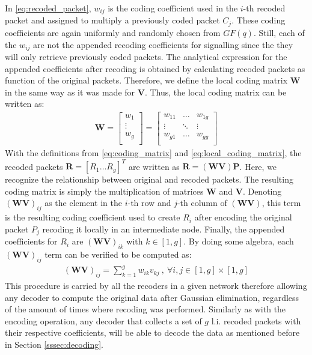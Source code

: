 In \eqref{eq:recoded_packet}, $w_{ij}$ is the coding coefficient used
in the $i$-th recoded packet and assigned to multiply a previously coded
packet $C_j$. These coding coefficients are again uniformly and randomly chosen
from $GF(q)$. Still, each of the $w_{ij}$ are not the appended recoding
coefficients for signalling since the they will only retrieve previously
coded packets. The analytical expression for the appended coefficients
after recoding is obtained by calculating recoded packets as function of the
original packets. Therefore, we define the local coding matrix $\textbf{W}$
in the same way as it was made for $\textbf{V}$. Thus, the local coding matrix
can be written as:
%
\begin{align} \label{eq:local_coding_matrix}
\textbf{W} =
\left[
\begin{array}{c}
        w_1    \\ \hline
        \vdots \\ \hline
        w_g    \\
\end{array}
\right]
=
\left[
\begin{array}{ccc}
        w_{11} & \ldots & w_{1g} \\
        \vdots  & \ddots & \vdots  \\
        w_{g1} & \ldots & w_{gg} \\
\end{array}
\right]
\end{align}
%
With the definitions from \eqref{eq:coding_matrix} and
\eqref{eq:local_coding_matrix}, the recoded packets
$\textbf{R} = \left[R_1 \ldots R_g \right]^T$ are written as
$\textbf{R} = (\textbf{W} \textbf{V}) \textbf{P}$. Here, we recognize
the relationship between original and recoded packets. The resulting
coding matrix is simply the multiplication of matrices $\textbf{W}$ and
$\textbf{V}$. Denoting ${(\textbf{W} \textbf{V})}_{ij}$ as the element
in the $i$-th row and $j$-th column of $(\textbf{W} \textbf{V})$, this
term is the resulting coding coefficient used to create $R_i$ after
encoding the original packet $P_j$ recoding it locally in an intermediate
node. Finally, the appended coefficients for $R_i$ are
${(\textbf{W} \textbf{V})}_{ik}$ with $k \in [1,g]$. By doing some
algebra, each ${(\textbf{W} \textbf{V})}_{ij}$ term can be verified to be
computed as:
%
\begin{align}
\label{eq:appended_coded_coefficients}
{(\textbf{W} \textbf{V})}_{ij} = \sum_{k=1}^{g} w_{ik} v_{kj}\ ,\ \forall i,j \in [1,g] \times [1,g]
\end{align}
%
This procedure is carried by all the recoders in a given network therefore
allowing any decoder to compute the original data after Gaussian elimination,
regardless of the amount of times where recoding was performed. Similarly
as with the encoding operation, any decoder that collects a set of
$g$ \ac{l.i.} recoded packets with their respective coefficients, will
be able to decode the data as mentioned before in Section \ref{sssec:decoding}.

